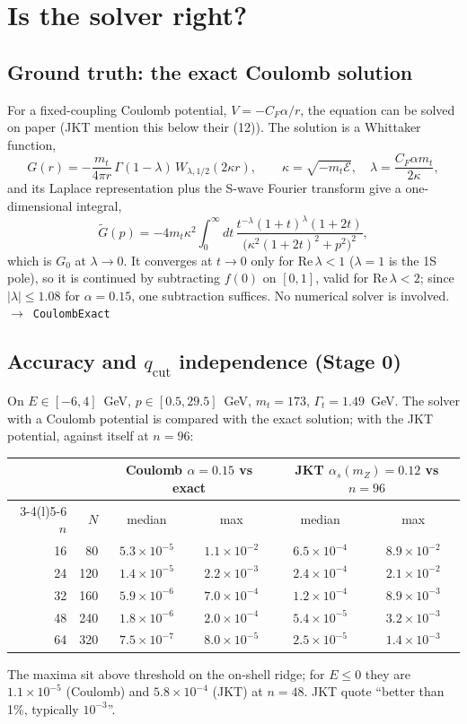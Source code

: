 \documentclass[11pt]{article}
\newcommand{\code}[1]{\texttt{#1}}
\newcommand{\Gt}{\Gamma_t}
\newcommand{\alphas}{\alpha_s}
\newcommand{\cE}{\mathcal{E}}
\newcommand{\qc}{q_\mathrm{cut}}
\newcommand{\fn}[1]{\hfill$\to$~\code{#1}}
\begin{document}
\section{Is the solver right?}
\label{sec:checks}

\subsection{Ground truth: the exact Coulomb solution}
\label{sec:coulomb}
For a fixed-coupling Coulomb potential, $V=-C_F\alpha/r$, the equation can be solved on paper (JKT mention this below their (12)).
The solution is a Whittaker function,
$$
G(r)=-\frac{m_t}{4\pi r}\,\Gamma(1-\lambda)\,W_{\lambda,1/2}(2\kappa r),\qquad \kappa=\sqrt{-m_t\cE},\quad \lambda=\frac{C_F\alpha m_t}{2\kappa},
$$
and its Laplace representation plus the S-wave Fourier transform give a one-dimensional integral,
$$
\tilde G(p)=-4m_t\kappa^2\!\int_0^\infty\!dt\,\frac{t^{-\lambda}(1+t)^{\lambda}(1+2t)}{\big(\kappa^2(1+2t)^2+p^2\big)^2},
$$
which is $G_0$ at $\lambda\to0$. It converges at $t\to0$ only for $\mathrm{Re}\,\lambda<1$ ($\lambda=1$ is the 1S pole), so it is
continued by subtracting $f(0)$ on $[0,1]$, valid for $\mathrm{Re}\,\lambda<2$; since $|\lambda|\le1.08$ for $\alpha=0.15$, one
subtraction suffices. No numerical solver is involved.
\fn{CoulombExact}

\subsection{Accuracy and $\qc$ independence (Stage 0)}
On $E\in[-6,4]$~GeV, $p\in[0.5,29.5]$~GeV, $m_t=173$, $\Gt=1.49$~GeV. The solver with a Coulomb potential is compared with the exact
solution; with the JKT potential, against itself at $n=96$:

\begin{center}\small
\begin{tabular}{@{}rrcccc@{}}
\toprule
 & & \multicolumn{2}{c}{Coulomb $\alpha=0.15$ vs exact} & \multicolumn{2}{c}{JKT $\alphas(m_Z)=0.12$ vs $n=96$}\\
\cmidrule(lr){3-4}\cmidrule(l){5-6}
$n$ & $N$ & median & max & median & max\\
\midrule
16 & 80  & $5.3\times10^{-5}$ & $1.1\times10^{-2}$ & $6.5\times10^{-4}$ & $8.9\times10^{-2}$\\
24 & 120 & $1.4\times10^{-5}$ & $2.2\times10^{-3}$ & $2.4\times10^{-4}$ & $2.1\times10^{-2}$\\
32 & 160 & $5.9\times10^{-6}$ & $7.0\times10^{-4}$ & $1.2\times10^{-4}$ & $8.9\times10^{-3}$\\
48 & 240 & $1.8\times10^{-6}$ & $2.0\times10^{-4}$ & $5.4\times10^{-5}$ & $3.2\times10^{-3}$\\
64 & 320 & $7.5\times10^{-7}$ & $8.0\times10^{-5}$ & $2.5\times10^{-5}$ & $1.4\times10^{-3}$\\
\bottomrule
\end{tabular}
\end{center}
The maxima sit above threshold on the on-shell ridge; for $E\le0$ they are $1.1\times10^{-5}$ (Coulomb) and $5.8\times10^{-4}$ (JKT) at
$n=48$. JKT quote ``better than 1\%, typically $10^{-3}$''.
\end{document}

